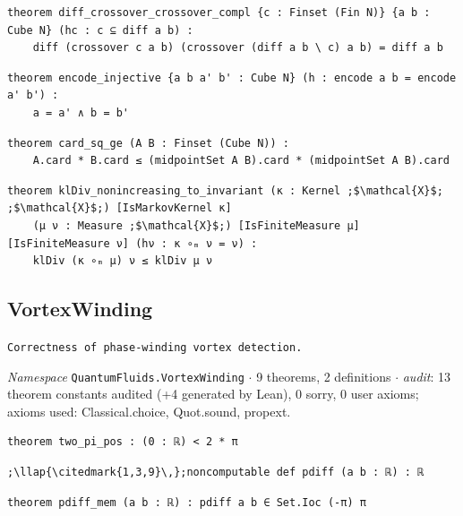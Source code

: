 \begin{lstlisting}[style=leancat]
theorem diff_crossover_crossover_compl {c : Finset (Fin N)} {a b : Cube N} (hc : c ⊆ diff a b) :
    diff (crossover c a b) (crossover (diff a b \ c) a b) = diff a b
\end{lstlisting}

\begin{lstlisting}[style=leancat]
theorem encode_injective {a b a' b' : Cube N} (h : encode a b = encode a' b') :
    a = a' ∧ b = b'
\end{lstlisting}

\begin{lstlisting}[style=leancat]
theorem card_sq_ge (A B : Finset (Cube N)) :
    A.card * B.card ≤ (midpointSet A B).card * (midpointSet A B).card
\end{lstlisting}

\begin{lstlisting}[style=leancat]
theorem klDiv_nonincreasing_to_invariant (κ : Kernel ;$\mathcal{X}$; ;$\mathcal{X}$;) [IsMarkovKernel κ]
    (μ ν : Measure ;$\mathcal{X}$;) [IsFiniteMeasure μ] [IsFiniteMeasure ν] (hν : κ ∘ₘ ν = ν) :
    klDiv (κ ∘ₘ μ) ν ≤ klDiv μ ν
\end{lstlisting}

\subsection{VortexWinding}\label{appA:VortexWinding}
{\footnotesize\raggedright\texttt{Correctness of phase-\allowbreak{}winding vortex detection.\allowbreak{}}\par}
{\footnotesize\raggedright\emph{Namespace} \texttt{QuantumFluids.\allowbreak{}VortexWinding} $\cdot$ 9 theorems, 2 definitions $\cdot$ \emph{audit}: 13 theorem constants audited (+4 generated by Lean), 0 sorry, 0 user axioms; axioms used: Classical.choice, Quot.sound, propext.\par}
\vspace{1pt}
\begin{lstlisting}[style=leancat]
theorem two_pi_pos : (0 : ℝ) < 2 * π
\end{lstlisting}

\begin{lstlisting}[style=leancat]
;\llap{\citedmark{1,3,9}\,};noncomputable def pdiff (a b : ℝ) : ℝ
\end{lstlisting}

\begin{lstlisting}[style=leancat]
theorem pdiff_mem (a b : ℝ) : pdiff a b ∈ Set.Ioc (-π) π
\end{lstlisting}

